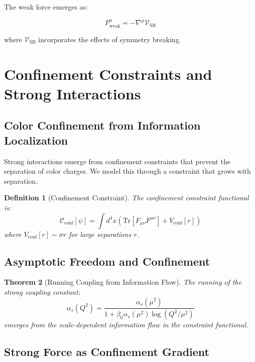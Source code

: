 \documentclass[11pt,a4paper]{article}
\newtheorem{theorem}{Theorem}
\newtheorem{definition}[theorem]{Definition}
\begin{document}
The weak force emerges as:

\begin{equation}
F_{\text{weak}}^{\mu} = -\nabla^{\mu} \mathcal{V}_{\text{SB}}
\end{equation}

where $\mathcal{V}_{\text{SB}}$ incorporates the effects of symmetry breaking.

\section{Confinement Constraints and Strong Interactions}

\subsection{Color Confinement from Information Localization}

Strong interactions emerge from confinement constraints that prevent the separation of color charges. We model this through a constraint that grows with separation.

\begin{definition}[Confinement Constraint]
The confinement constraint functional is:
\begin{equation}
\mathcal{C}_{\text{conf}}[\psi] = \int d^4x \left( \text{Tr}[F_{\mu\nu}F^{\mu\nu}] + V_{\text{conf}}[r] \right)
\end{equation}
where $V_{\text{conf}}[r] \sim \sigma r$ for large separations $r$.
\end{definition}

\subsection{Asymptotic Freedom and Confinement}

\begin{theorem}[Running Coupling from Information Flow]
The running of the strong coupling constant:
\begin{equation}
\alpha_s(Q^2) = \frac{\alpha_s(\mu^2)}{1 + \beta_0 \alpha_s(\mu^2) \log(Q^2/\mu^2)}
\end{equation}
emerges from the scale-dependent information flow in the constraint functional.
\end{theorem}

\subsection{Strong Force as Confinement Gradient}
\end{document}
